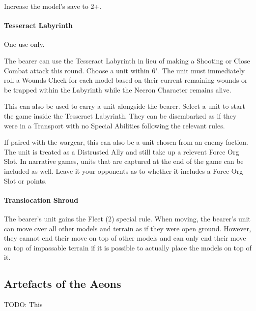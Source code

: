 Increase the model's save to 2+.

\paragraph*{Tesseract Labyrinth} \label{Tesseract Labyrinth}

One use only.

The bearer can use the Tesseract Labyrinth in lieu of making a Shooting or Close Combat attack this round. Choose a unit within 6". The unit must immediately roll a Wounds Check for each model based on their current remaining wounds or be trapped within the Labyrinth while the Necron Character remains alive.

This can also be used to carry a unit alongside the bearer. Select a unit to start the game inside the Tesseract Labyrinth. They can be disembarked as if they were in a Transport with no Special Abilities following the relevant rules. 

If paired with the  wargear, this can also be a unit chosen from an enemy faction. The unit is treated as a Distrusted Ally and still take up a relevent Force Org Slot. In narrative games, units that are captured at the end of the game can be included as well. Leave it your opponents as to whether it includes a Force Org Slot or points.

\paragraph*{Translocation Shroud} \label{Translocation Shroud}

The bearer's unit gains the Fleet (2) special rule. When moving, the bearer's unit can move over all other models and terrain as if they were open ground. However, they cannot end their move on top of other models and can only end their move on top of impassable terrain if it is possible to actually place the models on top of it.

\subsection{Artefacts of the Aeons} \label{Artefacts of the Aeons}

TODO: This
